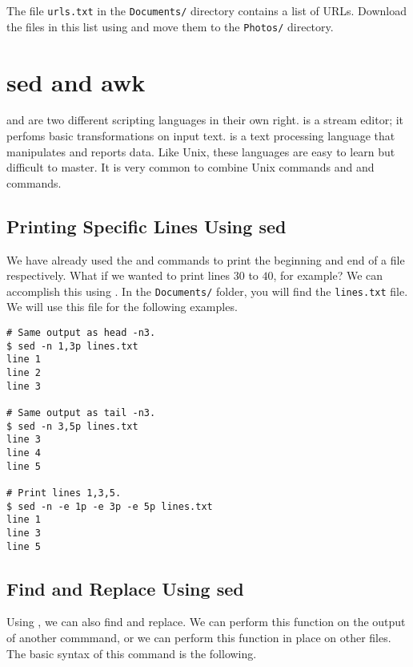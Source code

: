 \begin{problem}
The file \texttt{urls.txt} in the \texttt{Documents/} directory contains a list of URLs.
Download the files in this list using  and move them to the \texttt{Photos/} directory.
\end{problem}

\section*{sed and awk} %

 and  are two different scripting languages in their own right.
 is a stream editor; it perfoms basic transformations on input text.
 is a text processing language that manipulates and reports data.
Like Unix, these languages are easy to learn but difficult to master.
It is very common to combine Unix commands and  and  commands.

\subsection*{Printing Specific Lines Using sed} %

We have already used the  and  commands to print the beginning and end of a file respectively.
What if we wanted to print lines $30$ to $40$, for example?
We can accomplish this using .
In the \texttt{Documents/} folder, you will find the \texttt{lines.txt} file.
We will use this file for the following examples.

\begin{lstlisting}
# Same output as head -n3.
$ sed -n 1,3p lines.txt
line 1
line 2
line 3

# Same output as tail -n3.
$ sed -n 3,5p lines.txt
line 3
line 4
line 5

# Print lines 1,3,5.
$ sed -n -e 1p -e 3p -e 5p lines.txt
line 1
line 3
line 5
\end{lstlisting}

\subsection*{Find and Replace Using sed} %

Using , we can also find and replace.
We can perform this function on the output of another commmand, or we can perform this function in place on other files.
The basic syntax of this  command is the following.

